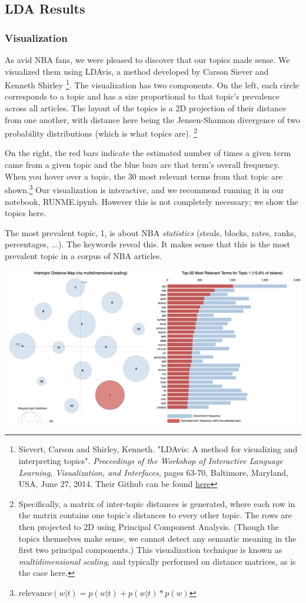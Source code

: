 \documentclass[11pt]{article}
\begin{document}
\subsection{LDA Results}
\subsubsection{Visualization}
As avid NBA fans, we were pleased to discover that our topics made sense.  We visualized them using LDAvis, a method developed by Carson Siever and Kenneth Shirley \footnote{Sievert, Carson and Shirley, Kenneth. "LDAvis: A method for visualizing and interpreting topics". \textit{Proceedings of the Workshop of Interactive Language Learning, Visualization, and Interfaces}, pages 63-70, Baltimore, Maryland, USA, June 27, 2014. Their Github can be found \href{https://github.com/cpsievert/LDAvis}{here}}.  The visualization has two components.  On the left, each circle corresponds to a topic and has a size  proportional to that topic's prevalence across all articles. The layout of the topics is a 2D projection of their distance from one another, with distance here being the Jensen-Shannon divergence of two probability distributions (which is what topics are). \footnote{Specifically, a matrix of inter-topic distances is generated, where each row in the matrix contains one topic's distances to every other topic.  The rows are then projected to 2D using Principal Component Analysis. (Though the topics themselves make sense, we cannot detect any semantic meaning in the first two principal components.) This visualization technique is known as \textit{multidimensional scaling}, and typically performed on distance matrices, as is the case here.}

On the right, the red bars indicate the estimated number of times a given term came from a given topic and the blue bars are that term's overall frequency. When you hover over a topic, the 30 most relevant terms from that topic are shown.\footnote{$\text{relevance}(w | t) = p(w | t) + p(w | t)*p(w)$}  Our visualization is interactive, and we recommend running it in our notebook, RUNME.ipynb.  However this is not completely necessary; we show the topics here. 

The most prevalent topic, 1, is about NBA \textit{statistics} (steals, blocks, rates, ranks, percentages, ...). The keywords reveal this.  It makes sense that this is the most prevalent topic in a corpus of NBA articles. 

\includegraphics[width=470pt]{1.png} \\
\end{document}
